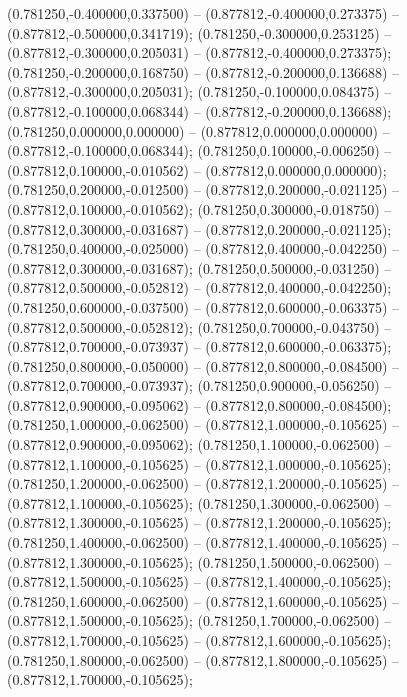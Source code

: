  (0.781250,-0.400000,0.337500) -- (0.877812,-0.400000,0.273375) -- (0.877812,-0.500000,0.341719);
 (0.781250,-0.300000,0.253125) -- (0.877812,-0.300000,0.205031) -- (0.877812,-0.400000,0.273375);
 (0.781250,-0.200000,0.168750) -- (0.877812,-0.200000,0.136688) -- (0.877812,-0.300000,0.205031);
 (0.781250,-0.100000,0.084375) -- (0.877812,-0.100000,0.068344) -- (0.877812,-0.200000,0.136688);
 (0.781250,0.000000,0.000000) -- (0.877812,0.000000,0.000000) -- (0.877812,-0.100000,0.068344);
 (0.781250,0.100000,-0.006250) -- (0.877812,0.100000,-0.010562) -- (0.877812,0.000000,0.000000);
 (0.781250,0.200000,-0.012500) -- (0.877812,0.200000,-0.021125) -- (0.877812,0.100000,-0.010562);
 (0.781250,0.300000,-0.018750) -- (0.877812,0.300000,-0.031687) -- (0.877812,0.200000,-0.021125);
 (0.781250,0.400000,-0.025000) -- (0.877812,0.400000,-0.042250) -- (0.877812,0.300000,-0.031687);
 (0.781250,0.500000,-0.031250) -- (0.877812,0.500000,-0.052812) -- (0.877812,0.400000,-0.042250);
 (0.781250,0.600000,-0.037500) -- (0.877812,0.600000,-0.063375) -- (0.877812,0.500000,-0.052812);
 (0.781250,0.700000,-0.043750) -- (0.877812,0.700000,-0.073937) -- (0.877812,0.600000,-0.063375);
 (0.781250,0.800000,-0.050000) -- (0.877812,0.800000,-0.084500) -- (0.877812,0.700000,-0.073937);
 (0.781250,0.900000,-0.056250) -- (0.877812,0.900000,-0.095062) -- (0.877812,0.800000,-0.084500);
 (0.781250,1.000000,-0.062500) -- (0.877812,1.000000,-0.105625) -- (0.877812,0.900000,-0.095062);
 (0.781250,1.100000,-0.062500) -- (0.877812,1.100000,-0.105625) -- (0.877812,1.000000,-0.105625);
 (0.781250,1.200000,-0.062500) -- (0.877812,1.200000,-0.105625) -- (0.877812,1.100000,-0.105625);
 (0.781250,1.300000,-0.062500) -- (0.877812,1.300000,-0.105625) -- (0.877812,1.200000,-0.105625);
 (0.781250,1.400000,-0.062500) -- (0.877812,1.400000,-0.105625) -- (0.877812,1.300000,-0.105625);
 (0.781250,1.500000,-0.062500) -- (0.877812,1.500000,-0.105625) -- (0.877812,1.400000,-0.105625);
 (0.781250,1.600000,-0.062500) -- (0.877812,1.600000,-0.105625) -- (0.877812,1.500000,-0.105625);
 (0.781250,1.700000,-0.062500) -- (0.877812,1.700000,-0.105625) -- (0.877812,1.600000,-0.105625);
 (0.781250,1.800000,-0.062500) -- (0.877812,1.800000,-0.105625) -- (0.877812,1.700000,-0.105625);
